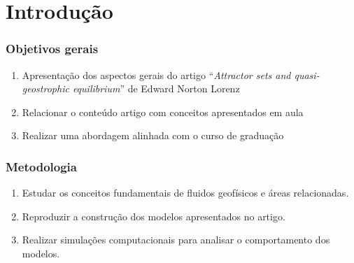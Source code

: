 \section{Introdução} 


\begin{frame}
	\frametitle{Objetivos gerais}
    \begin{enumerate}
        \item Apresentação dos aspectos gerais do artigo ``\textit{Attractor sets and quasi-geostrophic equilibrium}'' de Edward Norton Lorenz
        \item Relacionar o conteúdo artigo com conceitos apresentados em aula
        \item Realizar uma abordagem alinhada com o curso de graduação
    \end{enumerate}
\end{frame}


\begin{frame}
	\frametitle{Metodologia}
    \begin{enumerate}
        \item Estudar os conceitos fundamentais de fluidos geofísicos e áreas relacionadas.
        \item Reproduzir a construção dos modelos apresentados no artigo.
        \item Realizar simulações computacionais para analisar o comportamento dos modelos.
    \end{enumerate}
\end{frame}

